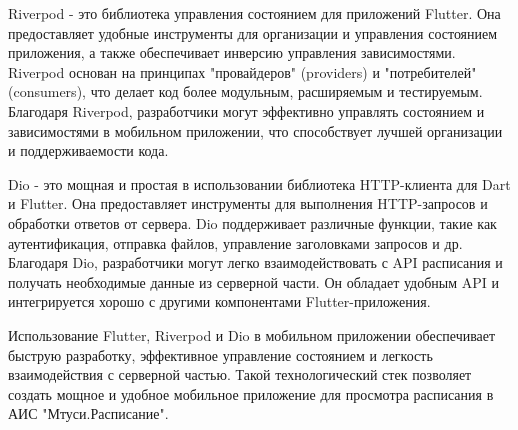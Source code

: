 Riverpod - это библиотека управления состоянием для приложений Flutter.
Она предоставляет удобные инструменты для организации и управления состоянием приложения,
а также обеспечивает инверсию управления зависимостями.
Riverpod основан на принципах "провайдеров" (providers) и "потребителей" (consumers),
что делает код более модульным, расширяемым и тестируемым. Благодаря Riverpod,
разработчики могут эффективно управлять состоянием и зависимостями в мобильном приложении,
что способствует лучшей организации и поддерживаемости кода.

Dio - это мощная и простая в использовании библиотека HTTP-клиента для Dart и Flutter.
Она предоставляет инструменты для выполнения HTTP-запросов и обработки ответов от сервера.
Dio поддерживает различные функции, такие как аутентификация, отправка файлов,
управление заголовками запросов и др. Благодаря Dio, разработчики могут легко взаимодействовать
с API расписания и получать необходимые данные из серверной части.
Он обладает удобным API и интегрируется хорошо с другими компонентами Flutter-приложения.

Использование Flutter, Riverpod и Dio в мобильном приложении обеспечивает быструю разработку,
эффективное управление состоянием и легкость взаимодействия с серверной частью.
Такой технологический стек позволяет создать мощное и удобное мобильное приложение для просмотра расписания в АИС "Мтуси.Расписание".
